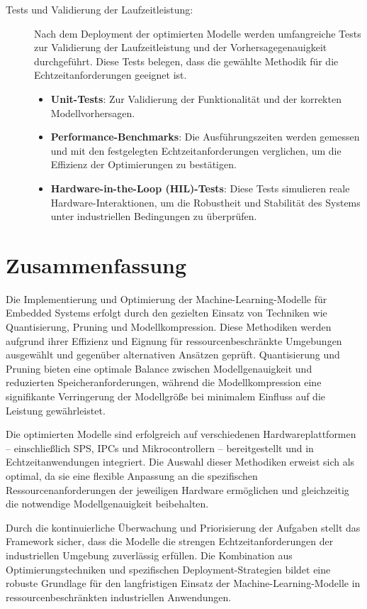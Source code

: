 \begin{description}
    \item[Tests und Validierung der Laufzeitleistung:] Nach dem Deployment der optimierten Modelle werden umfangreiche Tests zur Validierung der Laufzeitleistung 
    und der Vorhersagegenauigkeit durchgeführt. Diese Tests belegen, dass die gewählte Methodik für die Echtzeitanforderungen geeignet ist.
    \begin{itemize}
        \item \textbf{Unit-Tests}: Zur Validierung der Funktionalität und der korrekten Modellvorhersagen.
        \item \textbf{Performance-Benchmarks}: Die Ausführungszeiten werden gemessen und mit den festgelegten Echtzeitanforderungen verglichen, 
        um die Effizienz der Optimierungen zu bestätigen.
        \item \textbf{Hardware-in-the-Loop (HIL)-Tests}: Diese Tests simulieren reale Hardware-Interaktionen, um die Robustheit und Stabilität des Systems unter 
        industriellen Bedingungen zu überprüfen.
    \end{itemize}
\end{description}

\section{Zusammenfassung}

Die Implementierung und Optimierung der Machine-Learning-Modelle für Embedded Systems erfolgt durch den gezielten Einsatz von Techniken wie Quantisierung, 
Pruning und Modellkompression. Diese Methodiken werden aufgrund ihrer Effizienz und Eignung für ressourcenbeschränkte Umgebungen ausgewählt und gegenüber 
alternativen Ansätzen geprüft. Quantisierung und Pruning bieten eine optimale Balance zwischen Modellgenauigkeit und reduzierten Speicheranforderungen, 
während die Modellkompression eine signifikante Verringerung der Modellgröße bei minimalem Einfluss auf die Leistung gewährleistet.

Die optimierten Modelle sind erfolgreich auf verschiedenen Hardwareplattformen – einschließlich SPS, IPCs und Mikrocontrollern – bereitgestellt und in 
Echtzeitanwendungen integriert. Die Auswahl dieser Methodiken erweist sich als optimal, da sie eine flexible Anpassung an die spezifischen 
Ressourcenanforderungen der jeweiligen Hardware ermöglichen und gleichzeitig die notwendige Modellgenauigkeit beibehalten.

Durch die kontinuierliche Überwachung und Priorisierung der Aufgaben stellt das Framework sicher, dass die Modelle die strengen Echtzeitanforderungen der 
industriellen Umgebung zuverlässig erfüllen. Die Kombination aus Optimierungstechniken und spezifischen Deployment-Strategien bildet eine robuste Grundlage 
für den langfristigen Einsatz der Machine-Learning-Modelle in ressourcenbeschränkten industriellen Anwendungen.